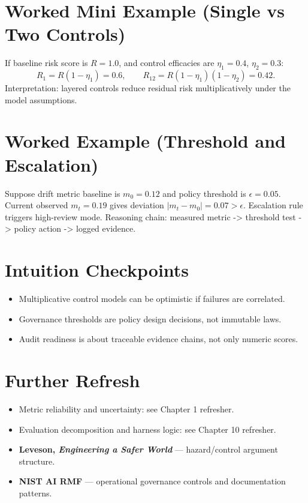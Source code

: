 \section*{Worked Mini Example (Single vs Two Controls)}
If baseline risk score is $R=1.0$, and control efficacies are $\eta_1=0.4$, $\eta_2=0.3$:
\[
R_1=R(1-\eta_1)=0.6,\qquad
R_{12}=R(1-\eta_1)(1-\eta_2)=0.42.
\]
Interpretation: layered controls reduce residual risk multiplicatively under the model assumptions.

\section*{Worked Example (Threshold and Escalation)}
Suppose drift metric baseline is $m_0=0.12$ and policy threshold is $\epsilon=0.05$.  
Current observed $m_t=0.19$ gives deviation $|m_t-m_0|=0.07>\epsilon$.  
Escalation rule triggers high-review mode.  
Reasoning chain: measured metric -> threshold test -> policy action -> logged evidence.

\section*{Intuition Checkpoints}
\begin{itemize}[leftmargin=1.5em]
  \item Multiplicative control models can be optimistic if failures are correlated.
  \item Governance thresholds are policy design decisions, not immutable laws.
  \item Audit readiness is about traceable evidence chains, not only numeric scores.
\end{itemize}

\section*{Further Refresh}
\begin{itemize}[leftmargin=1.5em]
  \item Metric reliability and uncertainty: see Chapter 1 refresher.
  \item Evaluation decomposition and harness logic: see Chapter 10 refresher.
  \item \textbf{Leveson, \emph{Engineering a Safer World}} --- hazard/control argument structure.
  \item \textbf{NIST AI RMF} --- operational governance controls and documentation patterns.
\end{itemize}

